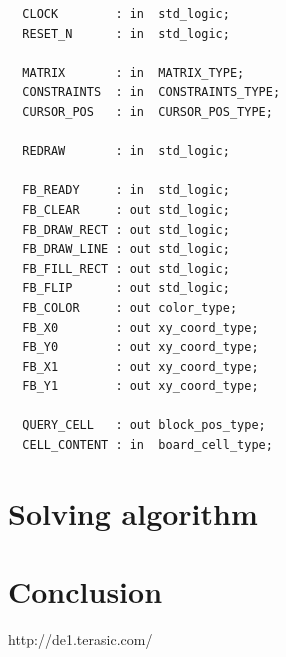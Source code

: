 \documentclass[12pt]{report}
\begin{document}
\begin{verbatim}
  CLOCK        : in  std_logic;
  RESET_N      : in  std_logic;

  MATRIX       : in  MATRIX_TYPE;
  CONSTRAINTS  : in  CONSTRAINTS_TYPE;
  CURSOR_POS   : in  CURSOR_POS_TYPE;

  REDRAW       : in  std_logic;

  FB_READY     : in  std_logic;
  FB_CLEAR     : out std_logic;
  FB_DRAW_RECT : out std_logic;
  FB_DRAW_LINE : out std_logic;
  FB_FILL_RECT : out std_logic;
  FB_FLIP      : out std_logic;
  FB_COLOR     : out color_type;
  FB_X0        : out xy_coord_type;
  FB_Y0        : out xy_coord_type;
  FB_X1        : out xy_coord_type;
  FB_Y1        : out xy_coord_type;

  QUERY_CELL   : out block_pos_type;
  CELL_CONTENT : in  board_cell_type;
\end{verbatim}

\chapter*{Solving algorithm}



\chapter*{Conclusion}


\renewcommand{\bibname}{References}
\begin{thebibliography}{100}

 http://de1.terasic.com/

\end{thebibliography}
\end{document}
